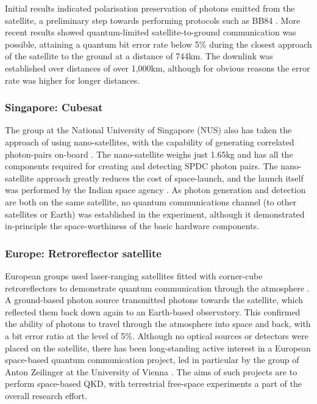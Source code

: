 Initial results indicated polarisation preservation of photons emitted from the satellite, a preliminary step towards performing protocols such as BB84 \cite{bib:carrasco2016leo}. More recent results showed quantum-limited satellite-to-ground communication was possible, attaining a quantum bit error rate below 5\% \cite{bib:takenaka2017} during the closest approach of the satellite to the ground at a distance of 744km. The downlink was established over distances of over 1,000km, although for obvious reasons the error rate was higher for longer distances.

%
%

\subsubsection{Singapore: Cubesat}

The group at the National University of Singapore (NUS) also has taken the approach of using nano-satellites, with the capability of generating correlated photon-pairs on-board \cite{bib:tang2016generation}. The nano-satellite weighs just 1.65kg and has all the components required for creating and detecting SPDC photon pairs. The nano-satellite approach greatly reduces the cost of space-launch, and the launch itself was performed by the Indian space agency . As photon generation and detection are both on the same satellite, no quantum communications channel (to other satellites or Earth) was established in the experiment, although it demonstrated in-principle the space-worthiness of the basic hardware components. 

%
%

\subsubsection{Europe: Retroreflector satellite}

European groups used laser-ranging satellites fitted with corner-cube retroreflectors to demonstrate quantum communication through the atmosphere \cite{bib:NJP_10_033038, bib:vallone15}. A ground-based photon source transmitted photons towards the satellite, which reflected them back down again to an Earth-based observatory. This confirmed the ability of photons to travel through the atmosphere into space and back, with a bit error ratio at the level of 5\%. Although no optical sources or detectors were placed on the satellite, there has been long-standing active interest in a European space-based quantum communication project, led in particular by the group of Anton Zeilinger at the University of Vienna \cite{bib:armengol08}. The aims of such projects are to perform space-based QKD, with terrestrial free-space experiments \cite{bib:NP_3_481, bib:Nat_489_269} a part of the overall research effort. 

